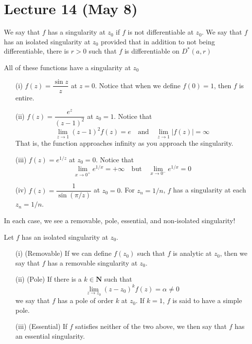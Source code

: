 \section{Lecture 14 (May 8)}
\begin{defi}
We say that $f$ has a singularity at $z_0$ if $f$ is not differentiable at $z_0$. We say that $f$ has an isolated singularity at $z_0$ provided that in addition to not being differentiable, there is $r>0$ such that $f$ is differentiable on $D^{*}(a,r)$
\end{defi}
\vspace{2ex}
\begin{ex}
All of these functions have a singularity at $z_0$
\begin{itemize}
\item[(i)] $f(z)=\dfrac{\sin z}{z}$ at $z=0$. Notice that when we define $f(0)=1$, then $f$ is entire.
\item[(ii)] $f(z)=\dfrac{e^{z}}{(z-1)^2}$ at $z_0=1$. Notice that 
\[\lim _{z\rightarrow 1}(z-1)^2f(z)=e\quad \mathrm{and}\quad \lim _{z\rightarrow 1}|f(z)|=\infty \]
That is, the function approaches infinity as you approach the singularity.
\item[(iii)] $f(z)=e^{1/z}$ at $z_0=0$. Notice that 
\[\lim _{x\rightarrow 0^{+}}e^{1/x}=+\infty \quad\mathrm{but}\quad\lim _{x\rightarrow 0^{-}}e^{1/x}=0\] 
\item[(iv)] $f(z)=\dfrac{1}{\sin (\pi /z)}$ at $z_0=0$. For $z_{n}=1/n$, $f$ has a singularity at each $z_{n}=1/n$. 
\end{itemize}
In each case, we see a removable, pole, essential, and non-isolated singularity!
\end{ex}
\vspace{2ex}
\begin{defi}
Let $f$ has an isolated singularity at $z_0$.
\begin{itemize}
\item[(i)] (Removable) If we can define $f(z_0)$ such that $f$ is analytic at $z_0$, then we say that $f$ has a removable singularity at $z_0$.
\item[(ii)] (Pole) If there is a $k\in {\bm N}$ such that 
\[\lim _{z\rightarrow z_0}(z-z_0)^{k}f(z)=\alpha \ne 0\]
we say that $f$ has a pole of order $k$ at $z_0$. If $k=1$, $f$ is said to have a simple pole.
\item[(iii)] (Essential) If $f$ satisfies neither of the two above, we then say that $f$ has an essential singularity.
\end{itemize}
\end{defi}
